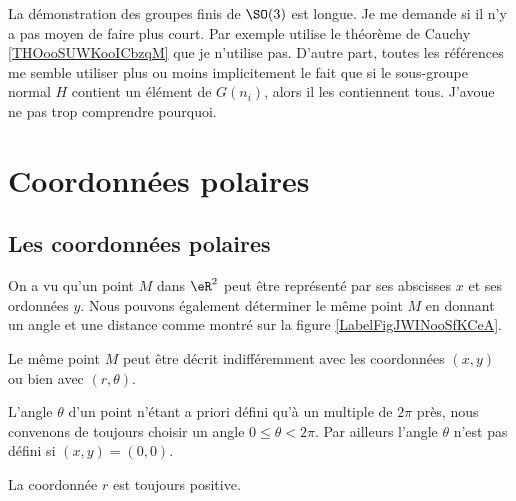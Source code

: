 \begin{probleme}
    La démonstration des groupes finis de \( \SO(3)\) est longue. Je me demande si il n'y a pas moyen de faire plus court. Par exemple \cite{ooYODPooHeNKiQ} utilise le théorème de Cauchy \ref{THOooSUWKooICbzqM} que je n'utilise pas. D'autre part, toutes les références me semble utiliser plus ou moins implicitement le fait que si le sous-groupe normal \( H\) contient un élément de \( G(n_i)\), alors il les contiennent tous. J'avoue ne pas trop comprendre pourquoi.
\end{probleme}


\section{Coordonnées polaires}

\subsection{Les coordonnées polaires}

On a vu qu'un point $M$ dans $\eR^2$ peut être représenté par ses abscisses $x$ et ses ordonnées $y$. Nous pouvons également déterminer le même point $M$ en donnant un angle et une distance comme montré sur la figure \ref{LabelFigJWINooSfKCeA}.
\newcommand{\CaptionFigJWINooSfKCeA}{Un point en coordonnées polaires est donné par sa distance à l'origine et par l'angle qu'il faut avec l'horizontale.}



Le même point $M$ peut être décrit indifféremment avec les coordonnées $(x,y)$ ou bien avec $(r,\theta)$.

\begin{remark}
	L'angle $\theta$ d'un point n'étant a priori défini qu'à un multiple de $2\pi$ près, nous convenons de toujours choisir un angle $0\leq\theta<2\pi$. Par ailleurs l'angle $\theta$ n'est pas défini si $(x,y)=(0,0)$.

	La coordonnée $r$ est toujours positive.
\end{remark}

